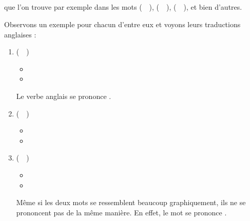 \subsection{}\label{subsec:efr}

que l'on trouve par exemple dans les mots 
(~~),  (~~),  (~~), et bien d'autres.

Observons un exemple pour chacun d'entre eux et voyons leurs
traductions anglaises :\par

\begin{enumerate}
\item {} (~~)
  \begin{itemize}
  \item {}
    \item {}
    \end{itemize}
    Le verbe anglais  se prononce
    \href{https://en.oxforddictionaries.com/definition/create}{}.
\item {} (~~)
  \begin{itemize}
  \item {}
  \item {}
  \end{itemize}
  

\item {} (~~)
  \begin{itemize}
  \item {}
  \item {}
  \end{itemize}
  Même si les deux mots se ressemblent beaucoup graphiquement, ils
  ne se prononcent pas de la même manière. En effet, le mot
   se prononce \href{https://en.oxforddictionaries.com/definition/republic}{}. 
\end{enumerate}

  
\subsection{}\label{subsec:ɛfr}

